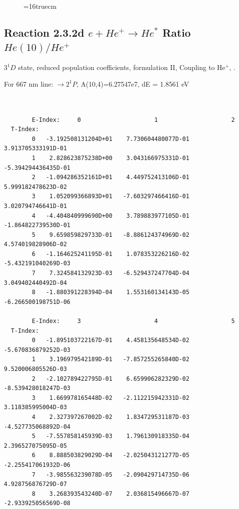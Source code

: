\documentclass[12pt,dvipdfmx]{article}
\begin{document}
\begin{figure} \label{2.3.2c}
\epsfxsize=16truecm
\end{figure}
\newpage


\subsection{
  Reaction 2.3.2d $e + He^+ \rightarrow He^*  $ Ratio $He(10)/He^+$
}

  $3^1D$ state,
  reduced population coefficients, formulation II,
  Coupling to He$^+$, \cite{kn:Fujimoto}.

  For 667 nm line: $\rightarrow 2^1P$, A(10,4)=6.27547e7, dE = 1.8561 eV

\begin{small}\begin{verbatim}


        E-Index:     0                     1                     2
  T-Index:
        0   -3.192508131204D+01    7.730604480077D-01    3.913705333191D-01
        1    2.828623875238D+00    3.043166975331D-01   -5.394294436435D-01
        2   -1.094286352161D+01    4.449752413106D-01    5.999182478623D-02
        3    1.052099366893D+01   -7.603297466416D-01    3.020794746641D-01
        4   -4.404840999690D+00    3.789883977105D-01   -1.864822739530D-01
        5    9.659859829733D-01   -8.886124374969D-02    4.574019828906D-02
        6   -1.164625241195D-01    1.078353226216D-02   -5.432191040269D-03
        7    7.324584132923D-03   -6.529437247704D-04    3.049402440492D-04
        8   -1.880391228394D-04    1.553160134143D-05   -6.266500198751D-06

        E-Index:     3                     4                     5
  T-Index:
        0   -1.895103722167D-01    4.458135648534D-02   -5.670836879252D-03
        1    3.196979542189D-01   -7.857255265840D-02    9.520006805526D-03
        2   -2.102789422795D-01    6.659906282329D-02   -8.539428018247D-03
        3    1.669978165448D-02   -2.112215942331D-02    3.118385995004D-03
        4    2.327397267002D-02    1.834729531187D-03   -4.527735068892D-04
        5   -7.557858145939D-03    1.796130918335D-04    2.396527075095D-05
        6    8.888503829029D-04   -2.025043121277D-05   -2.255417061932D-06
        7   -3.985563239078D-05   -2.090429714735D-06    4.928756876729D-07
        8    3.268393543240D-07    2.036815496667D-07   -2.933925056569D-08


\end{verbatim}
\end{small}
\end{document}
